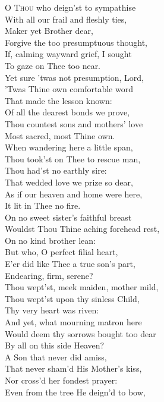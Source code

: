 \textsc{O Thou} who deign’st to sympathise \\
 With all our frail and fleshly ties, \\
 Maker yet Brother dear, \\
 Forgive the too presumptuous thought, \\
 If, calming wayward grief, I sought \\
 To gaze on Thee too near. \\
  Yet sure ’twas not presumption, Lord, \\
 ’Twas Thine own comfortable word \\
 That made the lesson known: \\
 Of all the dearest bonds we prove, \\
 Thou countest sons and mothers’ love \\
 Most sacred, most Thine own. \\
  When wandering here a little span, \\
 Thou took’st on Thee to rescue man, \\
 Thou had’st no earthly sire: \\
 That wedded love we prize so dear, \\
 As if our heaven and home were here, \\
 It lit in Thee no fire. \\
  On no sweet sister’s faithful breast \\
 Wouldst Thou Thine aching forehead rest, \\
 On no kind brother lean: \\
 But who, O perfect filial heart, \\
 E’er did like Thee a true son’s part, \\
 Endearing, firm, serene? \\
  Thou wept’st, meek maiden, mother mild, \\
 Thou wept’st upon thy sinless Child, \\
 Thy very heart was riven: \\
 And yet, what mourning matron here \\
 Would deem thy sorrows bought too dear \\
 By all on this side Heaven? \\
  A Son that never did amiss, \\
 That never sham’d His Mother’s kiss, \\
 Nor cross’d her fondest prayer: \\
 Even from the tree He deign’d to bow, \\
